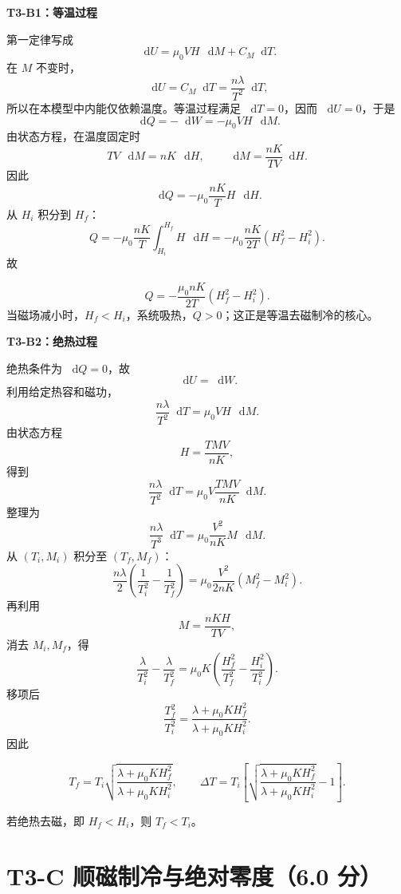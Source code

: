 \documentclass[UTF8,11pt,a4paper,fontset=fandol]{ctexart}
\newcommand{\dd}{\mathop{}\!\mathrm d}
\begin{document}
\begin{solutionbox}
\textbf{T3-B1：等温过程}

第一定律写成
\[
\dd U=\mu_0VH\,\dd M+C_M\dd T.
\]
在 $M$ 不变时，
\[
\dd U=C_M\dd T=\frac{n\lambda}{T^2}\dd T,
\]
所以在本模型中内能仅依赖温度。等温过程满足 $\dd T=0$，因而 $\dd U=0$，于是
\[
\dd Q=-\dd W=-\mu_0VH\,\dd M.
\]
由状态方程，在温度固定时
\[
TV\,\dd M=nK\,\dd H,
\qquad
\dd M=\frac{nK}{TV}\dd H.
\]
因此
\[
\dd Q=-\mu_0\frac{nK}{T}H\,\dd H.
\]
从 $H_i$ 积分到 $H_f$：
\[
Q=-\mu_0\frac{nK}{T}\int_{H_i}^{H_f}H\,\dd H
=-\mu_0\frac{nK}{2T}\left(H_f^2-H_i^2\right).
\]
故
\begin{answerbox}
\[
\boxed{Q=-\frac{\mu_0nK}{2T}\left(H_f^2-H_i^2\right)}.
\]
当磁场减小时，$H_f<H_i$，系统吸热，$Q>0$；这正是等温去磁制冷的核心。
\end{answerbox}

\textbf{T3-B2：绝热过程}

绝热条件为 $\dd Q=0$，故
\[
\dd U=\dd W.
\]
利用给定热容和磁功，
\[
\frac{n\lambda}{T^2}\dd T=\mu_0VH\,\dd M.
\]
由状态方程
\[
H=\frac{TMV}{nK},
\]
得到
\[
\frac{n\lambda}{T^2}\dd T
=\mu_0V\frac{TMV}{nK}\dd M.
\]
整理为
\[
\frac{n\lambda}{T^3}\dd T
=\mu_0\frac{V^2}{nK}M\,\dd M.
\]
从 $(T_i,M_i)$ 积分至 $(T_f,M_f)$：
\[
\frac{n\lambda}{2}\left(\frac1{T_i^2}-\frac1{T_f^2}\right)
=\mu_0\frac{V^2}{2nK}\left(M_f^2-M_i^2\right).
\]
再利用
\[
M=\frac{nKH}{TV},
\]
消去 $M_i,M_f$，得
\[
\frac{\lambda}{T_i^2}-\frac{\lambda}{T_f^2}
=\mu_0K\left(\frac{H_f^2}{T_f^2}-\frac{H_i^2}{T_i^2}\right).
\]
移项后
\[
\frac{T_f^2}{T_i^2}
=\frac{\lambda+\mu_0KH_f^2}{\lambda+\mu_0KH_i^2}.
\]
因此
\begin{answerbox}
\[
\boxed{T_f=T_i\sqrt{\frac{\lambda+\mu_0KH_f^2}{\lambda+\mu_0KH_i^2}}},
\qquad
\boxed{\Delta T=T_i\left[
\sqrt{\frac{\lambda+\mu_0KH_f^2}{\lambda+\mu_0KH_i^2}}-1\right]}.
\]
\end{answerbox}
若绝热去磁，即 $H_f<H_i$，则 $T_f<T_i$。
\end{solutionbox}

\section{T3-C 顺磁制冷与绝对零度（6.0 分）}
\end{document}
